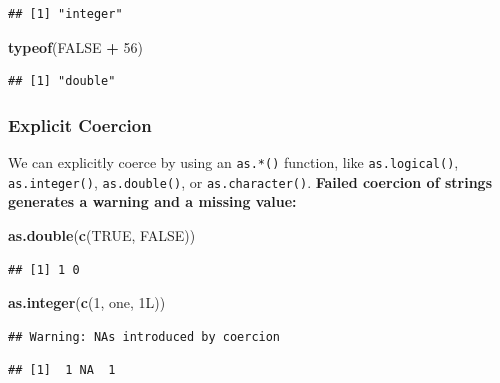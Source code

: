 \documentclass[
]{book}
\newenvironment{Shaded}{\begin{snugshade}}{\end{snugshade}}
\newcommand{\ConstantTok}[1]{\textcolor[rgb]{0.56,0.35,0.01}{#1}}
\newcommand{\DecValTok}[1]{\textcolor[rgb]{0.00,0.00,0.81}{#1}}
\newcommand{\FunctionTok}[1]{\textcolor[rgb]{0.13,0.29,0.53}{\textbf{#1}}}
\newcommand{\NormalTok}[1]{#1}
\newcommand{\SpecialCharTok}[1]{\textcolor[rgb]{0.81,0.36,0.00}{\textbf{#1}}}
\newcommand{\StringTok}[1]{\textcolor[rgb]{0.31,0.60,0.02}{#1}}
\begin{document}
\begin{verbatim}
## [1] "integer"
\end{verbatim}

\begin{Shaded}
\begin{Highlighting}[]
\FunctionTok{typeof}\NormalTok{(}\ConstantTok{FALSE} \SpecialCharTok{+} \DecValTok{56}\NormalTok{)}
\end{Highlighting}
\end{Shaded}

\begin{verbatim}
## [1] "double"
\end{verbatim}

\hypertarget{explicit-coercion}{%
\subsubsection*{Explicit Coercion}\label{explicit-coercion}}

We can explicitly coerce by using an \texttt{as.*()} function, like \texttt{as.logical()}, \texttt{as.integer()}, \texttt{as.double()}, or \texttt{as.character()}. \textbf{Failed coercion of strings generates a warning and a missing value:}

\begin{Shaded}
\begin{Highlighting}[]
\FunctionTok{as.double}\NormalTok{(}\FunctionTok{c}\NormalTok{(}\ConstantTok{TRUE}\NormalTok{, }\ConstantTok{FALSE}\NormalTok{))}
\end{Highlighting}
\end{Shaded}

\begin{verbatim}
## [1] 1 0
\end{verbatim}

\begin{Shaded}
\begin{Highlighting}[]
\FunctionTok{as.integer}\NormalTok{(}\FunctionTok{c}\NormalTok{(}\DecValTok{1}\NormalTok{, }\StringTok{\textquotesingle{}one\textquotesingle{}}\NormalTok{, 1L))}
\end{Highlighting}
\end{Shaded}

\begin{verbatim}
## Warning: NAs introduced by coercion
\end{verbatim}

\begin{verbatim}
## [1]  1 NA  1
\end{verbatim}
\end{document}
